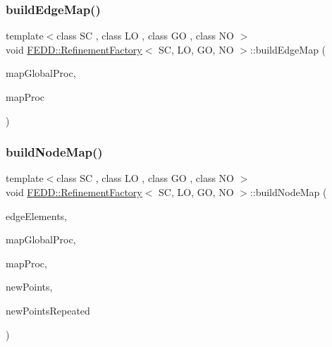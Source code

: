 \subsubsection{\texorpdfstring{build\+Edge\+Map()}{buildEdgeMap()}}
{\footnotesize\ttfamily template$<$class SC , class LO , class GO , class NO $>$ \\
void \hyperlink{classFEDD_1_1RefinementFactory}{F\+E\+D\+D\+::\+Refinement\+Factory}$<$ SC, LO, GO, NO $>$\+::build\+Edge\+Map (\begin{DoxyParamCaption}\item[{\hyperlink{classFEDD_1_1RefinementFactory_a8256ccdf1b2a5c977ddc011f4e8eb8d3}{Map\+Const\+Ptr\+\_\+\+Type}}]{map\+Global\+Proc,  }\item[{\hyperlink{classFEDD_1_1RefinementFactory_a8256ccdf1b2a5c977ddc011f4e8eb8d3}{Map\+Const\+Ptr\+\_\+\+Type}}]{map\+Proc }\end{DoxyParamCaption})}

\mbox{\label{classFEDD_1_1RefinementFactory_abeca9755a1bd393c36c792a78c6779e9}} 
\subsubsection{\texorpdfstring{build\+Node\+Map()}{buildNodeMap()}}
{\footnotesize\ttfamily template$<$class SC , class LO , class GO , class NO $>$ \\
void \hyperlink{classFEDD_1_1RefinementFactory}{F\+E\+D\+D\+::\+Refinement\+Factory}$<$ SC, LO, GO, NO $>$\+::build\+Node\+Map (\begin{DoxyParamCaption}\item[{\hyperlink{classFEDD_1_1RefinementFactory_ae5285e990ec4632d6188a1280627ad13}{Edge\+Elements\+Ptr\+\_\+\+Type}}]{edge\+Elements,  }\item[{\hyperlink{classFEDD_1_1RefinementFactory_a8256ccdf1b2a5c977ddc011f4e8eb8d3}{Map\+Const\+Ptr\+\_\+\+Type}}]{map\+Global\+Proc,  }\item[{\hyperlink{classFEDD_1_1RefinementFactory_a8256ccdf1b2a5c977ddc011f4e8eb8d3}{Map\+Const\+Ptr\+\_\+\+Type}}]{map\+Proc,  }\item[{int}]{new\+Points,  }\item[{int}]{new\+Points\+Repeated }\end{DoxyParamCaption})}


